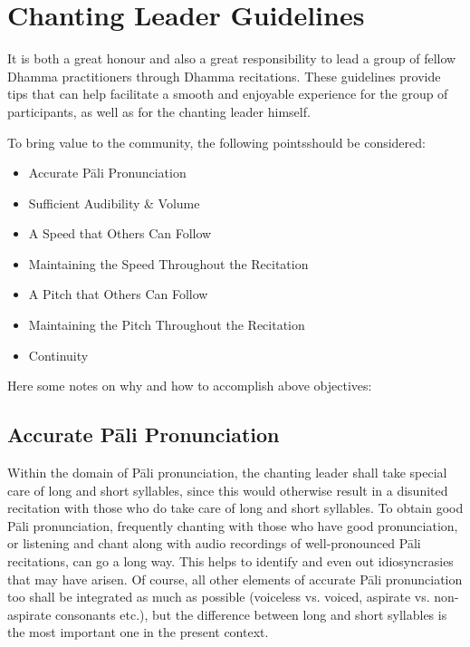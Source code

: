 \section{Chanting Leader Guidelines}

\begin{justify}
It is both a great honour and also a great responsibility to lead a group of fellow Dhamma practitioners through Dhamma recitations. These guidelines provide tips that can help facilitate a smooth and enjoyable experience for the group of participants, as well as for the chanting leader himself.
\end{justify}

To bring value to the community, the following pointsshould be considered:
\begin{itemize}
\item Accurate Pāli Pronunciation
\item Sufficient Audibility \& Volume
\item A Speed that Others Can Follow
\item Maintaining the Speed Throughout the Recitation
\item A Pitch that Others Can Follow
\item Maintaining the Pitch Throughout the Recitation
\item Continuity
\end{itemize}
Here some notes on why and how to accomplish above objectives:

\subsection*{Accurate Pāli Pronunciation}
\begin{justify}
Within the domain of Pāli pronunciation, the chanting leader shall take special care of long and short syllables, since this would otherwise result in a disunited recitation with those who do take care of long and short syllables. To obtain good Pāli pronunciation, frequently chanting with those who have good pronunciation, or listening and chant along with audio recordings of well-pronounced Pāli recitations, can go a long way. This helps to identify and even out idiosyncrasies that may have arisen. Of course, all other elements of accurate Pāli pronunciation too shall be integrated as much as possible (voiceless vs. voiced, aspirate vs. non-aspirate consonants etc.), but the difference between long and short syllables is the most important one in the present context.
\end{justify}

